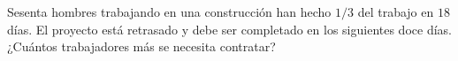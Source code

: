 Sesenta hombres trabajando en una construcción han hecho $1/3$ del trabajo en $18$ días. El proyecto está retrasado y debe ser completado en los siguientes doce días. ¿Cuántos trabajadores más se necesita contratar?